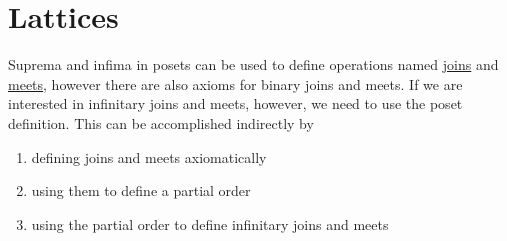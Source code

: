 \section{Lattices}\label{sec:lattices}

\begin{note}\label{note:infinite_join_meet}
  Suprema and infima in posets can be used to define operations named \ul{joins} and \ul{meets}, however there are also axioms for binary joins and meets. If we are interested in infinitary joins and meets, however, we need to use the poset definition. This can be accomplished indirectly by
  \begin{enumerate}
    \item defining joins and meets axiomatically
    \item using them to define a partial order
    \item using the partial order to define infinitary joins and meets
  \end{enumerate}
\end{note}

